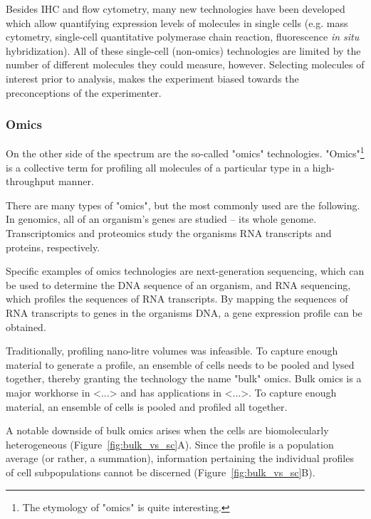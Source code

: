 Besides IHC and flow cytometry, many new technologies have been developed which allow quantifying expression levels of molecules in single cells (e.g. mass cytometry, single-cell quantitative polymerase chain reaction, fluorescence \emph{in situ} hybridization). All of these single-cell (non-omics) technologies are limited by the number of different molecules they could measure, however. Selecting molecules of interest prior to analysis, makes the experiment biased towards the preconceptions of the experimenter.

\subsubsection{Omics}
On the other side of the spectrum are the so-called "omics" technologies. "Omics"\footnote{The etymology of "omics" is quite interesting\cite{yadav_wholenesssuffixomics_2007}.} is a collective term for profiling all molecules of a particular type in a high-throughput manner.

There are many types of "omics", but the most commonly used are the following. In genomics, all of an organism's genes are studied -- its whole genome. Transcriptomics and proteomics study the organisms RNA transcripts and proteins, respectively. 

Specific examples of omics technologies are next-generation sequencing, which can be used to determine the DNA sequence of an organism, and RNA sequencing, which profiles the sequences of RNA transcripts. By mapping the sequences of RNA transcripts to genes in the organisms DNA, a gene expression profile can be obtained.

Traditionally, profiling nano-litre volumes was infeasible. To capture enough material to generate a profile, an ensemble of cells needs to be pooled and lysed together, thereby granting the technology the name "bulk" omics. 
Bulk omics is a major workhorse in <...> and has applications in <...>. To capture enough material, an ensemble of cells is pooled and profiled all together. 


A notable downside of bulk omics arises when the cells are biomolecularly heterogeneous (Figure~\ref{fig:bulk_vs_sc}A). Since the profile is a population average (or rather, a summation), information pertaining the individual profiles of cell subpopulations cannot be discerned (Figure~\ref{fig:bulk_vs_sc}B).


